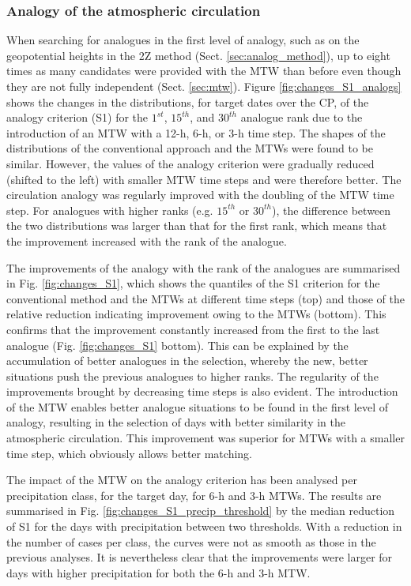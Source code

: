 \documentclass[hess, manuscript]{copernicus}
\begin{document}
	\subsubsection{Analogy of the atmospheric circulation}
	\label{sec:changes_analogy_circul}
	
	When searching for analogues in the first level of analogy, such as on the geopotential heights in the 2Z method (Sect. \ref{sec:analog_method}), up to eight times as many candidates were provided with the MTW than before even though they are not fully independent (Sect. \ref{sec:mtw}). Figure \ref{fig:changes_S1_analogs} shows the changes in the distributions, for target dates over the CP, of the analogy criterion (S1) for the $1^{st}$, $15^{th}$, and $30^{th}$ analogue rank due to the introduction of an MTW with a 12-h, 6-h, or 3-h time step. The shapes of the distributions of the conventional approach and the MTWs were found to be similar. However, the values of the analogy criterion were gradually reduced (shifted to the left) with smaller MTW time steps and were therefore better. The circulation analogy was regularly improved with the doubling of the MTW time step. For analogues with higher ranks (e.g. $15^{th}$ or $30^{th}$), the difference between the two distributions was larger than that for the first rank, which means that the improvement increased with the rank of the analogue. 
	
	The improvements of the analogy with the rank of the analogues are summarised in Fig. \ref{fig:changes_S1}, which shows the quantiles of the S1 criterion for the conventional method and the MTWs at different time steps (top) and those of the relative reduction indicating improvement owing to the MTWs (bottom). This confirms that the improvement constantly increased from the first to the last analogue (Fig. \ref{fig:changes_S1} bottom). This can be explained by the accumulation of better analogues in the selection, whereby the new, better situations push the previous analogues to higher ranks. The regularity of the improvements brought by decreasing time steps is also evident. The introduction of the MTW enables better analogue situations to be found in the first level of analogy, resulting in the selection of days with better similarity in the atmospheric circulation. This improvement was superior for MTWs with a smaller time step, which obviously allows better matching.
	
	The impact of the MTW on the analogy criterion has been analysed per precipitation class, for the target day, for 6-h and 3-h MTWs. The results are summarised in Fig. \ref{fig:changes_S1_precip_threshold} by the median reduction of S1 for the days with precipitation between two thresholds. With a reduction in the number of cases per class, the curves were not as smooth as those in the previous analyses. It is nevertheless clear that the improvements were larger for days with higher precipitation for both the 6-h and 3-h MTW.
	
\end{document}
